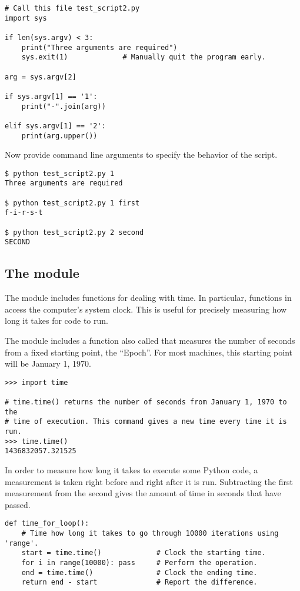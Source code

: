 \begin{lstlisting}
# Call this file test_script2.py
import sys

if len(sys.argv) < 3:
    print("Three arguments are required")
    sys.exit(1)             # Manually quit the program early.

arg = sys.argv[2]

if sys.argv[1] == '1':
    print("-".join(arg))

elif sys.argv[1] == '2':
    print(arg.upper())
\end{lstlisting}

Now provide command line arguments to specify the behavior of the script.

\begin{lstlisting}
$ python test_script2.py 1
Three arguments are required

$ python test_script2.py 1 first
f-i-r-s-t

$ python test_script2.py 2 second
SECOND
\end{lstlisting}

\subsection*{The  module}

The  module includes functions for dealing with time.
In particular, functions in  access the computer's system clock.
This is useful for precisely measuring how long it takes for code to run.

The  module includes a function also called  that measures the number of seconds from a fixed starting point, the ``Epoch''.
For most machines, this starting point will be January 1, 1970.

\begin{lstlisting}
>>> import time

# time.time() returns the number of seconds from January 1, 1970 to the
# time of execution. This command gives a new time every time it is run.
>>> time.time()
1436832057.321525
\end{lstlisting}

In order to measure how long it takes to execute some Python code, a measurement is taken right before and right after it is run.
Subtracting the first measurement from the second gives the amount of time in seconds that have passed.

\begin{lstlisting}
def time_for_loop():
    # Time how long it takes to go through 10000 iterations using 'range'.
    start = time.time()             # Clock the starting time.
    for i in range(10000): pass     # Perform the operation.
    end = time.time()               # Clock the ending time.
    return end - start              # Report the difference.
\end{lstlisting}


